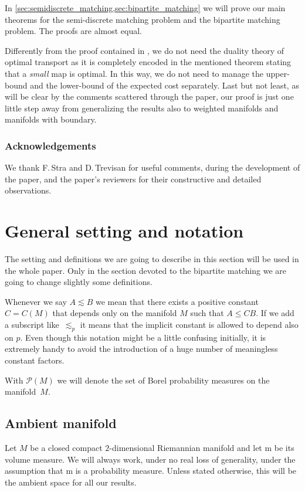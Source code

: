 \documentclass[10pt]{amsart}
\newcounter{results}[section]
\theoremstyle{plain}
\theoremstyle{definition}
\numberwithin{equation}{section}
\newcommand{\prob}{\ensuremath{\mathcal{P}}}
\newcommand{\m}{\ensuremath{\mathrm m}}
\begin{document}
In \cref{sec:semidiscrete_matching,sec:bipartite_matching} we will prove our main theorems for the
semi-discrete matching problem and the bipartite matching problem. The proofs are almost equal.

Differently from the proof contained in \cite{Ambrosio-Stra-Trevisan2018}, we do not need the duality theory
of optimal transport as it is completely encoded in the mentioned theorem stating that a \emph{small}
map is optimal.
In this way, we do not need to manage the upper-bound and the lower-bound of the expected cost separately.
Last but not least, as will be clear by the comments scattered through the paper, our proof is just one little step away from generalizing the results
also to weighted manifolds and manifolds with boundary.

\subsubsection*{Acknowledgements}
We thank F.\,Stra and D.\,Trevisan for useful comments, during the development of the paper, and the paper's reviewers
for their constructive and detailed observations.

\section{General setting and notation}
The setting and definitions we are going to describe in this section will be used in the whole paper.
Only in the section devoted to the bipartite matching we are going to change slightly some definitions.

Whenever we say $A\lesssim B$ we mean that there exists a positive constant $C=C(M)$ that
depends only on the manifold $M$ such that $A\le CB$. If we add a subscript like~$\lesssim_p$ it
means that the implicit constant is allowed to depend also on $p$.
Even though this notation might be a little confusing initially,
it is extremely handy to avoid the introduction of a huge number of meaningless constant factors.

With $\prob(M)$ we will denote the set of Borel probability measures on the manifold~$M$.

\subsection{Ambient manifold}\label{sub:setting}
Let $M$ be a closed compact $2$-dimensional Riemannian manifold and let $\m$ be its volume measure. We
will always work, under no real loss of generality, under the assumption that $\m$ is a probability measure.
Unless stated otherwise, this will be the ambient space for all our results.
\end{document}
